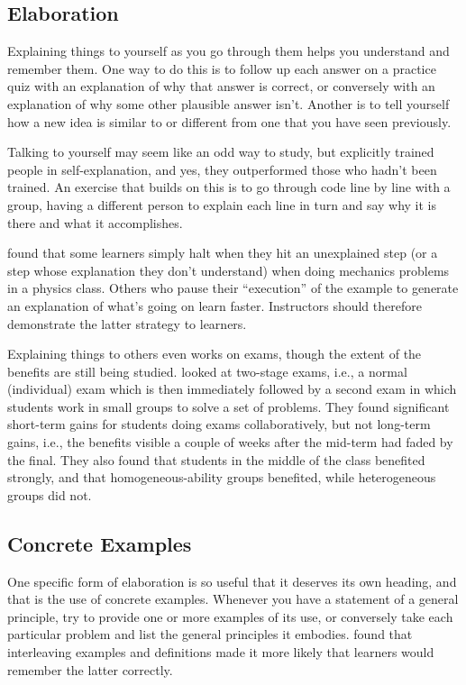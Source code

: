 \subsection{Elaboration}\label{elaboration}

Explaining things to yourself as you go through them helps you
understand and remember them. One way to do this is to follow up each
answer on a practice quiz with an explanation of why that answer is
correct, or conversely with an explanation of why some other plausible
answer isn't. Another is to tell yourself how a new idea is similar to
or different from one that you have seen previously.

Talking to yourself may seem like an odd way to study, but
\cite{Biel1995} explicitly trained people in self-explanation, and
yes, they outperformed those who hadn't been trained. An exercise that
builds on this is to go through code line by line with a group, having a
different person to explain each line in turn and say why it is there
and what it accomplishes.

\cite{Chi1989} found that some learners simply halt when they hit an
unexplained step (or a step whose explanation they don't understand)
when doing mechanics problems in a physics class. Others who pause their
``execution'' of the example to generate an explanation of what's going on
learn faster. Instructors should therefore demonstrate the latter
strategy to learners.

Explaining things to others even works on exams, though the extent of
the benefits are still being
studied. \cite{Cao2017a,Cao2017b} looked at two-stage
exams, i.e., a normal (individual) exam which is then immediately
followed by a second exam in which students work in small groups to
solve a set of problems. They found significant short-term gains for
students doing exams collaboratively, but not long-term gains, i.e.,
the benefits visible a couple of weeks after the mid-term had faded by
the final. They also found that students in the middle of the class
benefited strongly, and that homogeneous-ability groups benefited,
while heterogeneous groups did not.

\subsection{Concrete Examples}\label{concrete-examples}

One specific form of elaboration is so useful that it deserves its own
heading, and that is the use of concrete examples. Whenever you have a
statement of a general principle, try to provide one or more examples of
its use, or conversely take each particular problem and list the general
principles it embodies. \cite{Raws2014} found that interleaving
examples and definitions made it more likely that learners would
remember the latter correctly.

